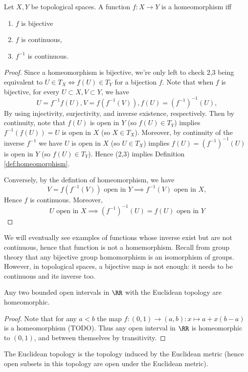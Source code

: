 \begin{proposition}
  Let $X,Y$ be topological spaces. A function $f:X\to Y$ is a homeomorphism iff
  \begin{enumerate}
    \item $f$ is bijective
    \item $f$ is continuous,
    \item $f^{-1}$ is continuous.
  \end{enumerate}
  \label{<+label+>}
\end{proposition}
\begin{proof}
  Since a homeomorphism is bijective, we're only left to check 2,3 being
  equivalent to $U\in T_X \iff f(U)\in T_Y$ for a bijection $f$. Note that when
  $f$ is bijective, for every $U\subset X, V\subset Y$, we have 
  \[ U=f^{-1}f(U), V=f(f^{-1}(V)), f(U)= (f^{-1})^{-1}(U),\]
  By using injectivity, surjectivity, and inverse existence, respectively. 
  Then by continuity, note that $f(U)$ is open in $Y$ (so $f(U)\in T_Y$) implies
  $f^{-1}(f(U))=U$ is open in $X$ (so $X\in T_X$). Moreover, by continuity of the
  inverse $f^{-1}$ we have $U$ is open in $X$ (so $U\in T_X$) implies
  $f(U)=(f^{-1})^{-1}(U)$ is open in $Y$ (so $f(U)\in T_Y$). Hence (2,3) implies
  Definition \ref{def:homeomorphism}.

  Conversely, by the defintion of homeomorphism, we have 
  \[V=f(f^{-1}(V)) \text{ open in } Y \implies f^{-1}(V) \text{ open in } X,\]
  Hence $f$ is continuous. Moreover,
  \[U \text{ open in } X \implies (f^{-1})^{-1}(U)=f(U) \text{ open in } Y\]
\end{proof}
\begin{remark}
  We will eventually see examples of functions whose inverse exist but are not
  continuous, hence that function is not a homemorphism. Recall from group
  theory that any bijective group homomorphism is an isomorphism of groups.
  However, in topological spaces, a bijective map is not enough: it needs to be
  continuous and its inverse too.
  \label{<+label+>}
\end{remark}

\begin{proposition}
  Any two bounded open intervals in $\RR$ with the Euclidean topology are
  homeomorphic.
  \label{<+label+>}
\end{proposition}
\begin{proof}
  Note that for any $a<b$ the map $f:(0,1)\to (a,b):x\mapsto a+x(b-a)$ is a
  homeomorphism (TODO). Thus any open interval in $\RR$ is homeomorphic to
  $(0,1)$, and between themselves by transitivity.
\end{proof}
\begin{remark}
  The Euclidean topology is the topology induced by the Euclidean metric (hence
  open subsets in this topology are open under the Euclidean metric).
  \label{<+label+>}
\end{remark}

